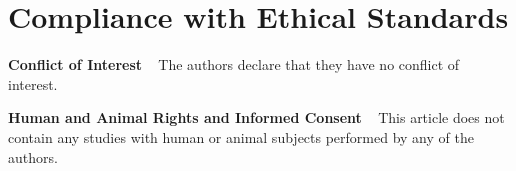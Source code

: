 \section{Compliance with Ethical Standards}
\noindent\textbf{Conflict of Interest} ~ The authors declare that they have no conflict of
interest. 

\vspace{3mm}

\noindent \textbf{Human and Animal Rights and Informed Consent} ~ This article does not contain any studies with human or animal subjects performed by any of the authors.




%
%


\renewcommand{\bibpreamble}{Papers of particular interest, published recently, have been highlighted as:\\
• Of importance \\
•• Of major importance}



